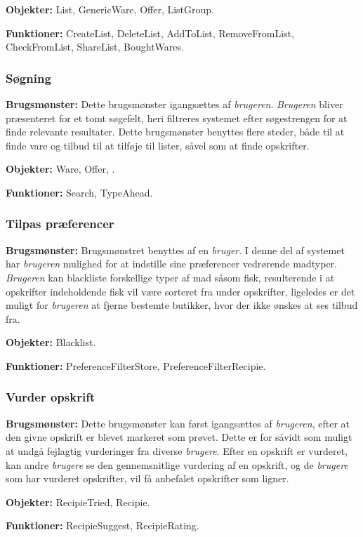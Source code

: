 \textbf{Objekter:} List, GenericWare, Offer, ListGroup.

\textbf{Funktioner:} CreateList, DeleteList, AddToList, RemoveFromList, CheckFromList, ShareList, BoughtWares.

\subsubsection*{Søgning}
\textbf{Brugsmønster:} Dette brugsmønster igangsættes af \textit{brugeren}.
\textit{Brugeren} bliver præsenteret for et tomt søgefelt, heri filtreres systemet efter søgestrengen for at finde relevante resultater.
Dette brugsmønster benyttes flere steder, både til at finde vare og tilbud til at tilføje til lister, såvel som at finde opskrifter.


\textbf{Objekter:} Ware, Offer, .

\textbf{Funktioner:} Search, TypeAhead.

\subsubsection*{Tilpas præferencer}
\textbf{Brugsmønster:} Brugsmønstret benyttes af en \textit{bruger}.
I denne del af systemet har \textit{brugeren} mulighed for at indstille sine præferencer vedrørende madtyper.
\textit{Brugeren} kan blackliste forskellige typer af mad såsom fisk, resulterende i at opskrifter indeholdende fisk vil være sorteret fra under opskrifter, ligeledes er det muligt for \textit{brugeren} at fjerne bestemte butikker, hvor der ikke ønskes at ses tilbud fra.

\textbf{Objekter:} Blacklist.

\textbf{Funktioner:} PreferenceFilterStore, PreferenceFilterRecipie.

\subsubsection*{Vurder opskrift}
\textbf{Brugsmønster:} Dette brugsmønster kan først igangsættes af \textit{brugeren}, efter at den givne opskrift er blevet markeret som prøvet.
Dette er for såvidt som muligt at undgå fejlagtig vurderinger fra diverse \textit{brugere}.
Efter en opskrift er vurderet, kan andre \textit{brugere} se den gennemsnitlige vurdering af en opskrift, og de \textit{brugere} som har vurderet opskrifter, vil få anbefalet opskrifter som ligner.

\textbf{Objekter:} RecipieTried, Recipie.

\textbf{Funktioner:} RecipieSuggest, RecipieRating.

